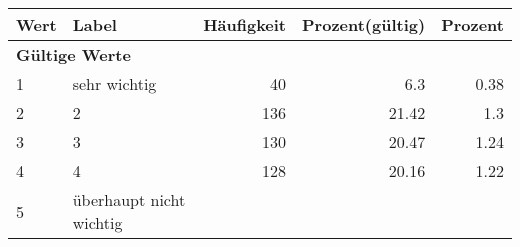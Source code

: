      \begin{longtable}{lXrrr}
     \toprule
     \textbf{Wert} & \textbf{Label} & \textbf{Häufigkeit} & \textbf{Prozent(gültig)} & \textbf{Prozent} \\
     \endhead
     \midrule
     \multicolumn{5}{l}{\textbf{Gültige Werte}}\\

     1 &
     \multicolumn{1}{X}{ sehr wichtig   } &


       \num{40} &
       \num[round-mode=places,round-precision=2]{6.3} &
         \num[round-mode=places,round-precision=2]{0.38} \\

     2 &
     \multicolumn{1}{X}{ 2   } &


       \num{136} &
       \num[round-mode=places,round-precision=2]{21.42} &
         \num[round-mode=places,round-precision=2]{1.3} \\

     3 &
     \multicolumn{1}{X}{ 3   } &


       \num{130} &
       \num[round-mode=places,round-precision=2]{20.47} &
         \num[round-mode=places,round-precision=2]{1.24} \\

     4 &
     \multicolumn{1}{X}{ 4   } &


       \num{128} &
       \num[round-mode=places,round-precision=2]{20.16} &
         \num[round-mode=places,round-precision=2]{1.22} \\

     5 &
     \multicolumn{1}{X}{ überhaupt nicht wichtig   } &



\end{longtable}
